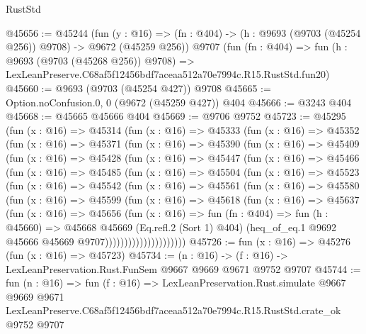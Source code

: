 \begin{lexlean}{RustStd}
\begin{coremodule}
@45656 := @45244
    (fun (y : @16) => (fn : @404) -> (h : @9693 (@9703 (@45254 @256)) @9708) -> @9672 (@45259 @256))
    @9707
    (fun (fn : @404) =>
    fun (h : @9693 (@9703 (@45268 @256)) @9708) =>
    LexLeanPreserve.C68af5f12456bdf7aceaa512a70e7994c.R15.RustStd.fun20)
@45660 := @9693 (@9703 (@45254 @427)) @9708
@45665 := Option.noConfusion.{0, 0} (@9672 (@45259 @427)) @404
@45666 := @3243 @404
@45668 := @45665 @45666 @404
@45669 := @9706 @9752
@45723 := @45295
    (fun (x : @16) =>
    @45314
      (fun (x : @16) =>
      @45333
        (fun (x : @16) =>
        @45352
          (fun (x : @16) =>
          @45371
            (fun (x : @16) =>
            @45390
              (fun (x : @16) =>
              @45409
                (fun (x : @16) =>
                @45428
                  (fun (x : @16) =>
                  @45447
                    (fun (x : @16) =>
                    @45466
                      (fun (x : @16) =>
                      @45485
                        (fun (x : @16) =>
                        @45504
                          (fun (x : @16) =>
                          @45523
                            (fun (x : @16) =>
                            @45542
                              (fun (x : @16) =>
                              @45561
                                (fun (x : @16) =>
                                @45580
                                  (fun (x : @16) =>
                                  @45599
                                    (fun (x : @16) =>
                                    @45618
                                      (fun (x : @16) =>
                                      @45637
                                        (fun (x : @16) =>
                                        @45656
                                          (fun (x : @16) =>
                                          fun (fn : @404) =>
                                          fun (h : @45660) =>
                                          @45668
                                            @45669
                                            (Eq.refl.{2} (Sort 1) @404)
                                            (heq_of_eq.{1}
                                              @9692
                                              @45666
                                              @45669
                                              @9707)))))))))))))))))))))
@45726 := fun (x : @16) => @45276 (fun (x : @16) => @45723)
@45734 := (n : @16) -> (f : @16) -> LexLeanPreservation.Rust.FunSem @9667 @9669 @9671 @9752 @9707
@45744 := fun (n : @16) =>
  fun (f : @16) =>
  LexLeanPreservation.Rust.simulate
    @9667
    @9669
    @9671
    LexLeanPreserve.C68af5f12456bdf7aceaa512a70e7994c.R15.RustStd.crate_ok
    @9752
    @9707
\end{coremodule}
\end{lexlean}

